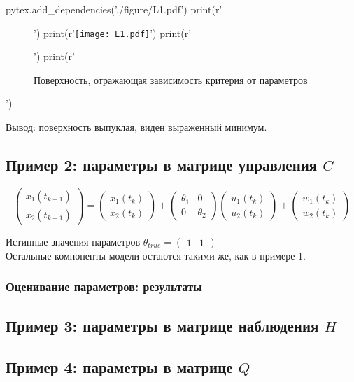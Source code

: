 \documentclass[a4paper,14pt]{extarticle}
\newcommand{\fut}[0]{t_{k+1}}
\begin{document}
\begin{pycode}
pytex.add_dependencies('./figure/L1.pdf')
print(r'\begin{figure}[H]')
print(r'\texttt{[image: L1.pdf]}')
print(r'\caption{Поверхность, отражающая зависимость критерия от параметров}')
print(r'\end{figure}')
\end{pycode}
Вывод: поверхность выпуклая, виден выраженный минимум.

\subsection{Пример 2: параметры в матрице управления $C$}
\[
  \begin{pmatrix} x_1(\fut) \\ x_2(\fut) \end{pmatrix} =
  \begin{pmatrix} x_1(t_k) \\ x_2(t_k) \end{pmatrix} +
  \begin{pmatrix} \theta_1 & 0 \\ 0 & \theta_2 \end{pmatrix}
  \begin{pmatrix} u_1(t_k) \\ u_2(t_k) \end{pmatrix}
  + \begin{pmatrix} w_1(t_k) \\ w_2(t_k) \end{pmatrix}
\]

Истинные значения параметров
$\theta_{true} = \begin{pmatrix} 1 & 1 \end{pmatrix}$ \\

Остальные компоненты модели остаются такими же, как в примере 1.

\subsubsection{Оценивание параметров: результаты}



\subsection{Пример 3: параметры в матрице наблюдения $H$}

\subsection{Пример 4: параметры в матрице $Q$}
\end{document}
